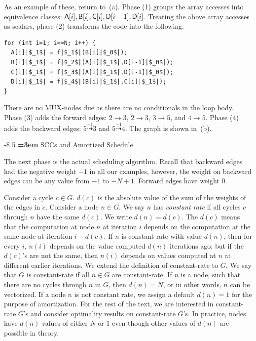 \documentclass[sigconf, screen, natbib=false, dvipsnames, table]{acmart}
\makeatletter
\renewcommand{\subsection}{\@startsection{subsection}{2}{\z@}%
                        {-8\p@ \@plus -4\p@ \@minus -4\p@}%
                        {5\p@ \@plus 2\p@ \@minus 2\p@}%
                        {\normalfont\Large\bfseries\boldmath
                         \rightskip=\z@ \@plus 3em\pretolerance=10000 }}
\theoremstyle{definition}
\makeatother
\begin{document}
As an example of these, return to~(a). Phase (1) groups the array accesses into equivalence classes:
${\sf A}[i], {\sf B}[i], {\sf C}[i], {\sf D}[i-1], {\sf D}[i]$. Treating the above array accesses as scalars, phase (2) transforms the code into the following:

\begin{verbatim}
for (int i=1; i<=N; i++) {
  A[i]|$_1$| = f|$_1$|(B[i]|$_0$|);
  B[i]|$_1$| = f|$_2$|(A[i]|$_1$|,D[i-1]|$_0$|);
  C[i]|$_1$| = f|$_3$|(A[i]|$_1$|,D[i-1]|$_0$|);
  D[i]|$_1$| = f|$_4$|(B[i]|$_1$|,C[i]|$_1$|);
}
\end{verbatim}

There are no MUX-nodes due as there are no conditionals in the loop body. Phase (3) adds the forward edges:
$2 \rightarrow 3$, $2 \rightarrow 3$, $3 \rightarrow 5$, and $4 \rightarrow 5$. Phase (4) adds the backward edges:
$5 \stackrel{-1}{\dasharrow} 3$ and $5 \stackrel{-1}{\dasharrow} 4$. The graph is shown in~(b).


\subsection{SCCs and Amortized Schedule}
\label{sec:scc}

The next phase is the actual scheduling algorithm. Recall that backward edges had
the negative weight $-1$ in all our examples, however, the weight on backward edges can be any value from $-1$ 
to $-N+1$. Forward edges have weight 0.

Consider a cycle $c \in G$. $d(c)$ is the absolute value of the sum of the weights of the edges in $c$. Consider a 
node $n \in G$. We say $n$ has \emph{constant rate} if all cycles $c$ through $n$ have the same $d(c)$. We write 
$d(n) = d(c)$. The $d(c)$ means that the computation at node $n$ at iteration $i$ depends on the computation 
at the same node at iteration $i-d(c)$. If $n$ is constant-rate with value $d(n)$, then for every $i$, $n(i)$
depends on the value computed $d(n)$ iterations ago; but if the $d(c)$'s are not the same, then $n(i)$ depends on 
values computed at $n$ at different earlier iterations. We extend the definition of constant-rate to $G$. We say that 
$G$ is constant-rate if all $n \in G$ are constant-rate. If $n$ is a node, such that there are no cycles through $n$ in $G$, 
then $d(n) = N$, or in other words, $n$ can be vectorized. If a node $n$ is not constant rate, we assign a default $d(n) = 1$ 
for the purpose of amortization. For the rest of the text, we are interested in constant-rate $G$'s and consider optimality 
results on constant-rate $G$'s. In practice, nodes have $d(n)$ values of either $N$ or $1$ even though other values of 
$d(n)$ are possible in theory. 
\end{document}
